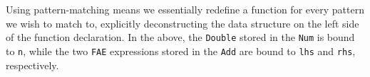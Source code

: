 \documentclass[format=acmlarge, review=false, nonacm=false, screen=true]{acmart}
\begin{document}
Using pattern-matching means we essentially redefine a function for every pattern we wish to match to, explicitly deconstructing the data structure on the left side of the function declaration. In the above, the \texttt{Double} stored in the \texttt{Num} is bound to \texttt{n}, while the two \texttt{FAE} expressions stored in the \texttt{Add} are bound to \texttt{lhs} and \texttt{rhs}, respectively.

\end{document}
